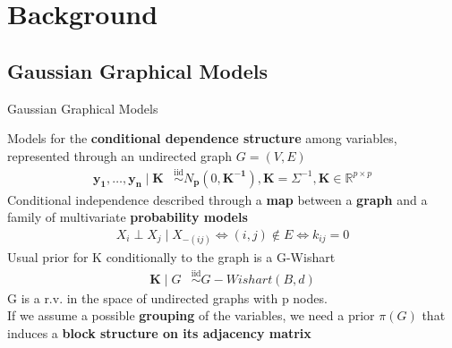 

\section{Background}

\subsection{Gaussian Graphical Models}
\begin{frame}{Gaussian Graphical Models}
\newcommand{\iid}{\overset{\mathrm{iid}}{\sim}}
\newcommand{\ind}{\overset{\mathrm{ind}}{\sim}}

    Models for the \textbf{conditional dependence structure} among variables, represented through an undirected graph $G=(V,E)$
    \begin{align*}
    \mathbf{y_{1}}, \ldots, \mathbf{y_{n}} \mid \mathbf{K} &\iid N_\mathbf{{p}}(0,\mathbf{K^{-1}}), \mathbf{K}=\Sigma^{-1}, \mathbf{K} \in \mathbb{R}^{p\times p}  %
    \end{align*}
Conditional independence described through a \textbf{map} between a \textbf{graph} and a family of multivariate \textbf{probability models}
\begin{align*}
X_{i}\perp X_{j} \mid X_{-(ij)}\Leftrightarrow (i,j) \notin E \Leftrightarrow k_{ij}=0
\end{align*}
Usual prior for K conditionally to the graph is a G-Wishart
\centering
\begin{align*}
    \mathbf{K} \mid G &\iid G-Wishart(B,d)
\end{align*}
G is a r.v. in the space of undirected graphs with p nodes.\\
If we assume a possible \textbf{grouping} of the variables, we need a prior $\pi(G)$ that induces a \textbf{block structure on its adjacency matrix}
\end{frame}




